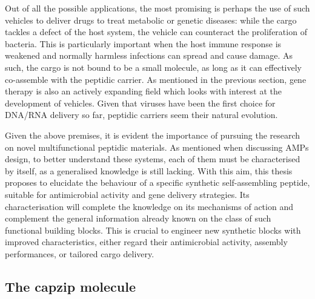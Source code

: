 Out of all the possible applications, the most promising is perhaps the use of such vehicles to deliver drugs to treat metabolic or genetic diseases: while the cargo tackles a defect of the host system, the vehicle can counteract the proliferation of bacteria. This is particularly important when the host immune response is weakened and normally harmless infections can spread and cause damage.
%
As such, the cargo is not bound to be a small molecule, as long as it can effectively co-assemble with the peptidic carrier. As mentioned in the previous section, gene therapy is also an actively expanding field which looks with interest at the development of vehicles. Given that viruses have been the first choice for DNA/RNA delivery so far, peptidic carriers seem their natural evolution.

Given the above premises, it is evident the importance of pursuing the research on novel multifunctional peptidic materials.
%
As mentioned when discussing AMPs design, to better understand these systems, each of them must be characterised by itself, as a generalised knowledge is still lacking.
With this aim, this thesis proposes to elucidate the behaviour of a specific synthetic self-assembling peptide, suitable for antimicrobial activity and gene delivery strategies.
%
Its characterisation will complete the knowledge on its mechanisms of action and complement the general information already known on the class of such functional building blocks. This is crucial to engineer new synthetic blocks with improved characteristics, either regard their antimicrobial activity, assembly performances, or tailored cargo delivery.


\subsection{The capzip molecule} \label{sec:capzip}

